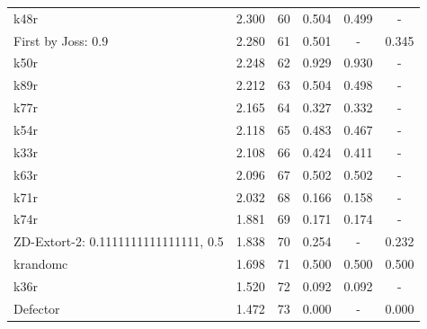 \begin{tabular}{lccccc}
k48r & 2.300 & 60 & 0.504 & 0.499 & - \\
First by Joss: 0.9 & 2.280 & 61 & 0.501 & - & 0.345 \\
k50r & 2.248 & 62 & 0.929 & 0.930 & - \\
k89r & 2.212 & 63 & 0.504 & 0.498 & - \\
k77r & 2.165 & 64 & 0.327 & 0.332 & - \\
k54r & 2.118 & 65 & 0.483 & 0.467 & - \\
k33r & 2.108 & 66 & 0.424 & 0.411 & - \\
k63r & 2.096 & 67 & 0.502 & 0.502 & - \\
k71r & 2.032 & 68 & 0.166 & 0.158 & - \\
k74r & 1.881 & 69 & 0.171 & 0.174 & - \\
ZD-Extort-2: 0.1111111111111111, 0.5 & 1.838 & 70 & 0.254 & - & 0.232 \\
krandomc & 1.698 & 71 & 0.500 & 0.500 & 0.500 \\
k36r & 1.520 & 72 & 0.092 & 0.092 & - \\
Defector & 1.472 & 73 & 0.000 & - & 0.000 \\
\bottomrule
\end{tabular}
